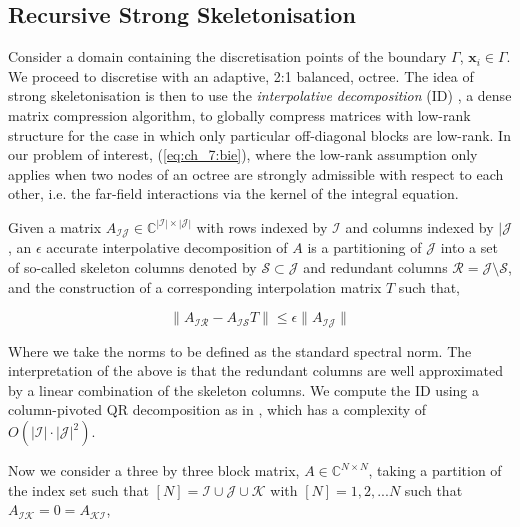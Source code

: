 \subsection*{Recursive Strong Skeletonisation}

Consider a domain containing the discretisation points of the boundary $\Gamma$, $\mathbf{x}_i \in \Gamma$. We proceed to discretise with an adaptive, 2:1 balanced, octree. The idea of strong skeletonisation is then to use the \textit{interpolative decomposition} (ID) \cite{cheng2005compression}, a dense matrix compression algorithm, to globally compress matrices with low-rank structure for the case in which only particular off-diagonal blocks are low-rank. In our problem of interest, (\ref{eq:ch_7:bie}), where the low-rank assumption only applies when two nodes of an octree are strongly admissible with respect to each other, i.e. the far-field interactions via the kernel of the integral equation.

\begin{definition}
    Given a matrix $A_{\mathcal{I} \mathcal{J}} \in \mathbb{C}^{|\mathcal{I}| \times |\mathcal{J}|}$ with rows indexed by $\mathcal{I}$ and columns indexed by $|\mathcal{J}$, an $\epsilon$ accurate interpolative decomposition of $A$ is a partitioning of $\mathcal{J}$ into a set of so-called skeleton columns denoted by $\mathcal{S} \subset \mathcal{J}$ and redundant columns $\mathcal{R} = \mathcal{J} \setminus \mathcal{S}$, and the construction of a corresponding interpolation matrix $T$ such that,

    $$\| A_{\mathcal{I} \mathcal{R}} - A_{\mathcal{I} \mathcal{S}} T \| \leq \epsilon \| A_{\mathcal{I} \mathcal{J}} \| $$

    Where we take the norms to be defined as the standard spectral norm. The interpretation of the above is that the redundant columns are well approximated by a linear combination of the skeleton columns. We compute the ID using a column-pivoted QR decomposition as in \cite{sushnikova2022fmm}, which has a complexity of $O(|\mathcal{I}| \cdot |\mathcal{J}|^2)$.
    \label{def:ch_7:id}
\end{definition}

Now we consider a three by three block matrix, $A \in \mathbb{C}^{N \times N}$, taking a partition of the index set such that $[N]= \mathcal{I} \cup \mathcal{J} \cup \mathcal{K}$ with $[N] = {1, 2, ... N}$ such that $A_{\mathcal{I} \mathcal{K}} = 0 = A_{\mathcal{K} \mathcal{I}}$,

